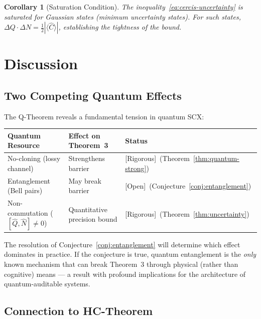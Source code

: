 \documentclass[12pt,a4paper]{article}
\newtheorem{corollary}[theorem]{Corollary}
\newcommand{\rigorous}{\textcolor{green!50!black}{\small\textsf{[Rigorous]}}}
\newcommand{\openquest}{\textcolor{red!70!black}{\small\textsf{[Open]}}}
\begin{document}
\begin{corollary}[Saturation Condition]
\label{cor:saturation}
The inequality~\eqref{eq:cercis-uncertainty} is saturated for Gaussian states
(minimum uncertainty states).  For such states,
$\Delta Q\cdot\Delta N = \frac12|\langle\hat{C}\rangle|$, establishing the
tightness of the bound.
\end{corollary}

\section{Discussion}

\subsection{Two Competing Quantum Effects}

The Q-Theorem reveals a fundamental tension in quantum SCX:

\begin{center}
\begin{tabular}{@{}lll@{}}
\toprule
\textbf{Quantum Resource} & \textbf{Effect on Theorem~3} & \textbf{Status} \\
\midrule
No-cloning (lossy channel)  & Strengthens barrier   & \rigorous~(Theorem~\ref{thm:quantum-strong}) \\
Entanglement (Bell pairs)   & May break barrier     & \openquest~(Conjecture~\ref{conj:entanglement}) \\
Non-commutation ($[\hat{Q},\hat{N}]\neq0$) & Quantitative precision bound & \rigorous~(Theorem~\ref{thm:uncertainty}) \\
\bottomrule
\end{tabular}
\end{center}

The resolution of Conjecture~\ref{conj:entanglement} will determine which
effect dominates in practice.  If the conjecture is true, quantum entanglement
is the \emph{only} known mechanism that can break Theorem~3 through physical
(rather than cognitive) means — a result with profound implications for the
architecture of quantum-auditable systems.

\subsection{Connection to HC-Theorem}
\end{document}
